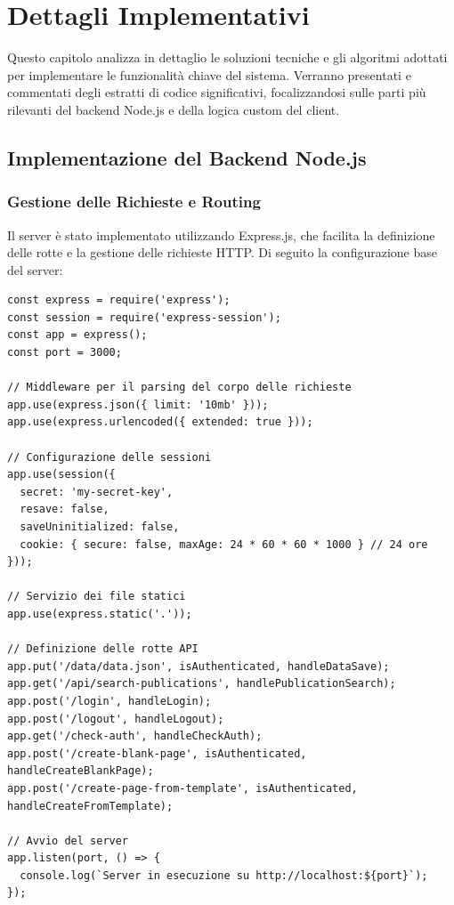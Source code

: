 \chapter{Dettagli Implementativi}
\label{chap:implementazione}

Questo capitolo analizza in dettaglio le soluzioni tecniche e gli algoritmi adottati per implementare le funzionalità chiave del sistema. Verranno presentati e commentati degli estratti di codice significativi, focalizzandosi sulle parti più rilevanti del backend Node.js e della logica custom del client.

\section{Implementazione del Backend Node.js}

\subsection{Gestione delle Richieste e Routing}
Il server è stato implementato utilizzando Express.js, che facilita la definizione delle rotte e la gestione delle richieste HTTP. Di seguito la configurazione base del server:

\begin{verbatim}
const express = require('express');
const session = require('express-session');
const app = express();
const port = 3000;

// Middleware per il parsing del corpo delle richieste
app.use(express.json({ limit: '10mb' }));
app.use(express.urlencoded({ extended: true }));

// Configurazione delle sessioni
app.use(session({
  secret: 'my-secret-key',
  resave: false,
  saveUninitialized: false,
  cookie: { secure: false, maxAge: 24 * 60 * 60 * 1000 } // 24 ore
}));

// Servizio dei file statici
app.use(express.static('.'));

// Definizione delle rotte API
app.put('/data/data.json', isAuthenticated, handleDataSave);
app.get('/api/search-publications', handlePublicationSearch);
app.post('/login', handleLogin);
app.post('/logout', handleLogout);
app.get('/check-auth', handleCheckAuth);
app.post('/create-blank-page', isAuthenticated, handleCreateBlankPage);
app.post('/create-page-from-template', isAuthenticated, handleCreateFromTemplate);

// Avvio del server
app.listen(port, () => {
  console.log(`Server in esecuzione su http://localhost:${port}`);
});
\end{verbatim}


